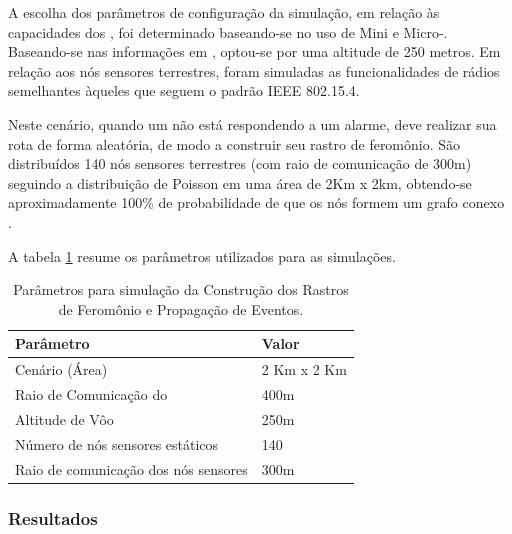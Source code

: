 A escolha dos parâmetros de configuração da simulação, em relação às capacidades dos \vants, foi determinado baseando-se no uso de Mini e Micro-\vants. Baseando-se nas informações em \cite{uas_2009,Storvold2009}, optou-se por uma altitude de 250 metros. Em relação aos nós sensores terrestres, foram simuladas as funcionalidades de rádios semelhantes àqueles que seguem o padrão IEEE 802.15.4.

Neste cenário, quando um \vant não está respondendo a um alarme, deve realizar sua rota de forma aleatória, de modo a construir seu rastro de feromônio. São distribuídos 140 nós sensores terrestres (com raio de comunicação de 300m) seguindo a distribuição de Poisson em uma área de 2Km x 2km, obtendo-se aproximadamente 100\% de probabilidade de que os nós formem um grafo conexo \cite{Bettstetter2002}.

A tabela \ref{tbl:setup} resume os parâmetros utilizados para as simulações.

\begin{table}[h!]
\centering
	\begin{tabular}{| l | l |}
		\hline
		Parâmetro & Valor \\
		\hline
		Cenário (Área)  & 2 Km x 2 Km\\
		Raio de Comunicação do \vant & 400m\\
		Altitude de Vôo & 250m  \\
		Número de nós sensores estáticos & 140  \\
		Raio de comunicação dos nós sensores & 300m \\
		\hline
	\end{tabular}

	\caption{Parâmetros para simulação da Construção dos Rastros de Feromônio e Propagação de Eventos.}
	\label{tbl:setup}
\end{table}


\subsubsection{Resultados}

